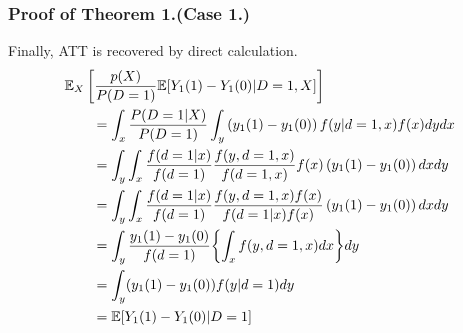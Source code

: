 \documentclass[fleqn]{beamer}
\begin{document}
\begin{frame}\frametitle{Proof of Theorem 1.(Case 1.)}
    Finally, ATT is recovered by direct calculation.
    \begin{align*}
        \MoveEqLeft
        \mathbb{E}_{X}\left[\frac{p(X)}{P(D = 1)}\mathbb{E}[Y_{1}(1) - Y_{1}(0)|D = 1, X]\right]
        \\&=
        \int_{x}\frac{P(D = 1|X)}{P(D = 1)} \int_{y} \left(y_{1}(1) - y_{1}(0)\right)f(y|d = 1, x)f(x)dydx
        \\&=
        \int_{y}\int_{x}\frac{f(d = 1|x)}{f(d = 1)}\frac{f(y, d = 1, x)}{f(d = 1, x)}f(x)\left(y_{1}(1) - y_{1}(0)\right)dxdy
        \\&=
        \int_{y}\int_{x}\frac{f(d = 1|x)}{f(d = 1)}\frac{f(y, d = 1, x)f(x)}{f(d = 1 |x)f(x)}\left(y_{1}(1) - y_{1}(0)\right)dxdy
        \\&=
        \int_{y}\frac{y_{1}(1) - y_{1}(0)}{f(d = 1)} \biggl \{ \int_{x}f(y, d = 1, x)dx \biggl \} dy
        \\&=
        \int_{y}(y_{1}(1) - y_{1}(0))f(y|d = 1)dy
        \\&=
        \mathbb{E}[Y_{1}(1) - Y_{1}(0)|D = 1]
    \end{align*}
\end{frame}
\end{document}
